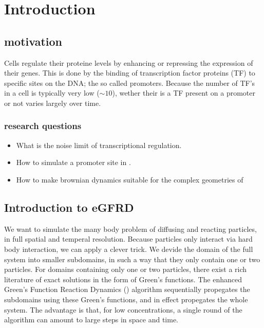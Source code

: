 \section{Introduction}



\subsection{motivation}
Cells regulate their proteine levels by enhancing or repressing the expression of their genes. This is done by the binding of transcription factor proteins (TF) to specific sites on the DNA; the so called promoters. Because the number of TF's in a cell is typically very low ($\sim 10$), wether their is a TF present on a promoter or not varies largely over time. 

\subsubsection{research questions}
\begin{itemize}
 \item What is the noise limit of transcriptional regulation.
 \item How to simulate a promoter site in \GFRD.
 \item How to make brownian dynamics suitable for the complex geometries of \GFRD
\end{itemize}



\subsection{Introduction to eGFRD}
We want to simulate the many body problem of diffusing and reacting particles, in full spatial and temperal resolution. Because particles only interact via hard body interaction, we can apply a clever trick. We devide the domain of the full system into smaller subdomains, in such a way that they only contain one or two particles. For domains containing only one or two particles, there exist a rich literature of exact solutions in the form of Green's functions. The enhanced Green's Function Reaction Dynamics (\GFRD) algorithm sequentially propegates the subdomains using these Green's functions, and in effect propegates the whole system. \cite{VanZon2006}\cite{VanZon2005}\cite{Takahashi2010} The advantage is that, for low concentrations, a single round of the algorithm can amount to large steps in space and time. 

